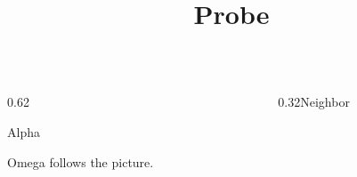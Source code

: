 \documentclass[9pt,aspectratio=43]{beamer}
\title{Probe}
\date{}
\begin{document}
\begin{frame}\begin{columns}[onlytextwidth,T]\begin{column}{0.62\textwidth}\begin{center}Alpha\par {}\par Omega follows the picture.\end{center}\end{column}\begin{column}{0.32\textwidth}Neighbor\end{column}\end{columns}\end{frame}
\end{document}
